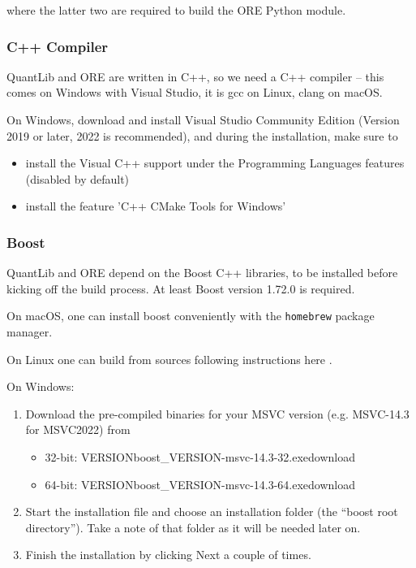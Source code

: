 where the latter two are required to build the ORE Python module.

\subsubsection*{C++ Compiler}

QuantLib and ORE are written in C++, so we need a C++ compiler -- this comes on Windows with Visual Studio, it is gcc on Linux,
clang on macOS.

On Windows, download and install Visual Studio Community Edition (Version 2019 or later, 2022 is recommended), and during the installation,
make sure to
\begin{itemize}
\item install the Visual C++ support under the Programming Languages features (disabled by default)
\item install the feature 'C++ CMake Tools for Windows'
\end{itemize}

\subsubsection*{Boost}

QuantLib and ORE depend on the Boost C++ libraries, to be installed before kicking off the build process.
At least Boost version 1.72.0 is required.

On macOS, one can install boost conveniently with the {\tt homebrew} package manager.

On Linux one can build from sources following instructions here \cite{boost}.

On Windows:
\begin{enumerate}
\item Download the pre-compiled binaries for your MSVC version (e.g. MSVC-14.3 for MSVC2022) from \cite{boost-binaries}
\begin{itemize}
\item 32-bit: \cite{boost-binaries}{\bs}VERSION{\bs}boost\_VERSION-msvc-14.3-32.exe{\bs}download 
\item 64-bit: \cite{boost-binaries}{\bs}VERSION{\bs}boost\_VERSION-msvc-14.3-64.exe{\bs}download
\end{itemize}
\item Start the installation file and choose an installation folder (the ``boost root directory'').
  Take a note of that folder as it will be needed later on.   
\item Finish the installation by clicking Next a couple of times.
\end{enumerate}
    
